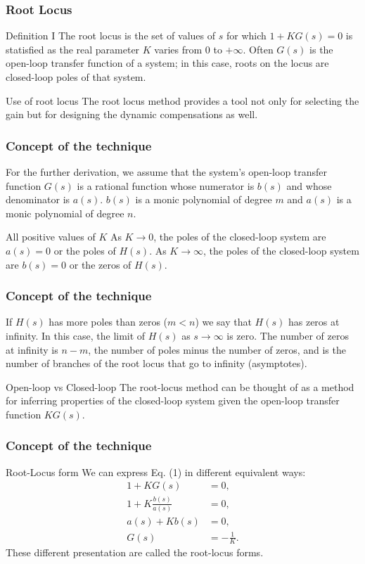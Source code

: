 \begin{frame}
\frametitle{Root Locus}
	\begin{block}{Definition I}
		The root locus is the set of values of $s$ for which $1 + KG(s) = 0$ is statisfied as the real parameter $K$ varies from $0$ to $+\infty$. Often $G(s)$ is the open-loop transfer function of a system; in this case, roots on the locus are closed-loop poles of that system.
	\end{block}
	\begin{block}{Use of root locus}
		The root locus method provides a tool not only for selecting the gain but for designing the dynamic compensations as well.
	\end{block}
	
\end{frame}

\begin{frame}
\frametitle{Concept of the technique}
	For the further derivation, we assume that the system's open-loop transfer function $G(s)$ is a rational function whose numerator is $b(s)$ and whose denominator is $a(s)$. $b(s)$ is a monic polynomial of degree $m$ and $a(s)$ is a monic polynomial of degree $n$. 
	\vspace{1em}
	\begin{block}{All positive values of $K$}
		As $K \rightarrow 0$, the poles of the closed-loop system are $a(s) = 0$ or the poles of $H(s)$. As $K \rightarrow \infty$, the poles of the closed-loop system are $b(s) = 0$ or the zeros of $H(s)$.
	\end{block}
\end{frame}

\begin{frame}
\frametitle{Concept of the technique}
	If $H(s)$ has more poles than zeros ($m < n$) we say that $H(s)$ has zeros at infinity. In this case, the limit of $H(s)$ as $s \rightarrow \infty$ is zero. The number of zeros at infinity is $n-m$, the number of poles minus the number of zeros, and is the number of branches of the root locus that go to infinity (asymptotes).
	
	\begin{alertblock}{Open-loop vs Closed-loop}
		The root-locus method can be thought of as a method for inferring properties of the closed-loop system given the open-loop transfer function $KG(s)$.
	\end{alertblock}
\end{frame}

\begin{frame}
\frametitle{Concept of the technique}
\begin{block}{Root-Locus form}
	We can express Eq. (1) in different equivalent ways:
	\vspace{-1em}
	\begin{align*}
		1 + KG(s) &= 0,\\
		1 + K\frac{b(s)}{a(s)} &= 0,\\
		a(s) + Kb(s) &=0,\\
		G(s) & = -\frac{1}{K}.
	\end{align*}
	These different presentation are called the root-locus forms.
\end{block}
\end{frame}

